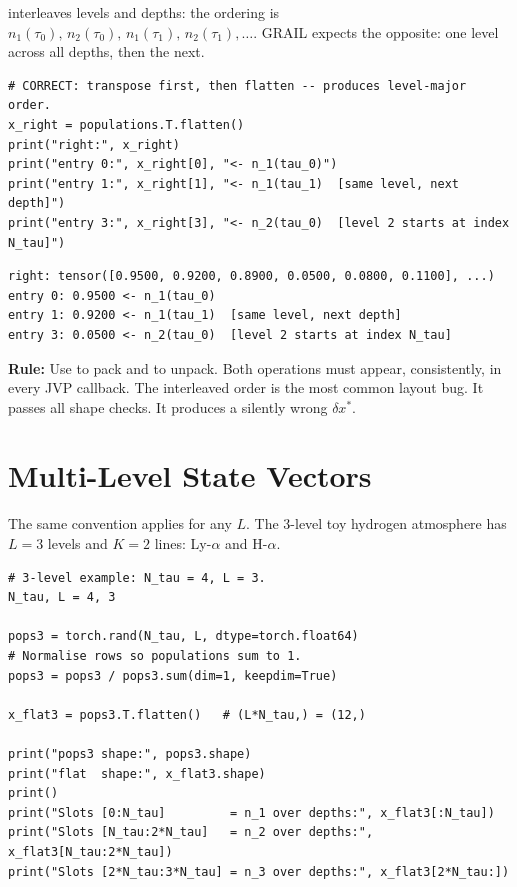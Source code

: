 interleaves levels and depths: the ordering is
$n_1(\tau_0),\, n_2(\tau_0),\, n_1(\tau_1),\, n_2(\tau_1), \ldots$.
GRAIL expects the opposite: one level across all depths, then the next.

\begin{lstlisting}[style=grailInStyle]
# CORRECT: transpose first, then flatten -- produces level-major order.
x_right = populations.T.flatten()
print("right:", x_right)
print("entry 0:", x_right[0], "<- n_1(tau_0)")
print("entry 1:", x_right[1], "<- n_1(tau_1)  [same level, next depth]")
print("entry 3:", x_right[3], "<- n_2(tau_0)  [level 2 starts at index N_tau]")
\end{lstlisting}

\begin{lstlisting}[style=grailOutStyle]
right: tensor([0.9500, 0.9200, 0.8900, 0.0500, 0.0800, 0.1100], ...)
entry 0: 0.9500 <- n_1(tau_0)
entry 1: 0.9200 <- n_1(tau_1)  [same level, next depth]
entry 3: 0.0500 <- n_2(tau_0)  [level 2 starts at index N_tau]
\end{lstlisting}

\begin{advisorybox}
\textbf{Rule:} Use  to pack and
 to unpack.
Both operations must appear, consistently, in every JVP callback.
The interleaved  order is the most common layout bug.
It passes all shape checks.
It produces a silently wrong $\delta x^*$.
\end{advisorybox}

\section{Multi-Level State Vectors}
\label{sec:multiline}

The same convention applies for any $L$.
The 3-level toy hydrogen atmosphere has $L = 3$ levels and $K = 2$ lines:
Ly-$\alpha$ and H-$\alpha$.

\begin{lstlisting}[style=grailInStyle]
# 3-level example: N_tau = 4, L = 3.
N_tau, L = 4, 3

pops3 = torch.rand(N_tau, L, dtype=torch.float64)
# Normalise rows so populations sum to 1.
pops3 = pops3 / pops3.sum(dim=1, keepdim=True)

x_flat3 = pops3.T.flatten()   # (L*N_tau,) = (12,)

print("pops3 shape:", pops3.shape)
print("flat  shape:", x_flat3.shape)
print()
print("Slots [0:N_tau]         = n_1 over depths:", x_flat3[:N_tau])
print("Slots [N_tau:2*N_tau]   = n_2 over depths:", x_flat3[N_tau:2*N_tau])
print("Slots [2*N_tau:3*N_tau] = n_3 over depths:", x_flat3[2*N_tau:])
\end{lstlisting}

